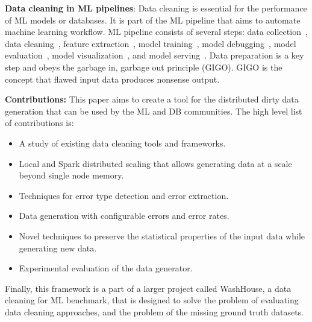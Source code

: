 
\textbf{Data cleaning in ML pipelines}: 
Data cleaning is essential for the performance of ML models or databases.
It is part of the ML pipeline that aims to automate machine learning workflow. 
ML pipeline consists of several steps: data collection~\cite{LiDLMS2015}, data cleaning~\cite{raha, baran, RekatsinasCIR2017, holodetect, activeclean, alphaclean, cleanml}, feature extraction~\cite{ShahLKYK2021}, model training~\cite{RekatsinasCIR2017}, model debugging~\cite{SagadeevaB2021}, model evaluation~\cite{generalizing_confusion_matrix}, model visualization~\cite{NakandalaKP2019, CrottyGZBK2015, SimonyanVZ2013}, and model serving~\cite{OlstonFGHLLRR2017, Lee2018, WeiGZWCNOSR2018}.
Data preparation is a key step and obeys the garbage in, garbage out principle (GIGO).
GIGO is the concept that flawed input data produces nonsense output.

\textbf{Contributions:} 
This paper aims to create a tool for the distributed dirty data generation that can be used by the ML and DB communities. 
The high level list of contributions is:

\begin{itemize}
    \item A study of existing data cleaning tools and frameworks.
    \item Local and Spark distributed scaling that allows generating data at a scale beyond single node memory.
    \item Techniques for error type detection and error extraction.
    \item Data generation with configurable errors and error rates.
    \item Novel techniques to preserve the statistical properties of the input data while generating new data.
    \item Experimental evaluation of the data generator.
\end{itemize}

Finally, this framework is a part of a larger project called WashHouse, a data cleaning for ML benchmark, that is designed to solve the problem of evaluating data cleaning approaches, and the problem of the missing ground truth datasets.


